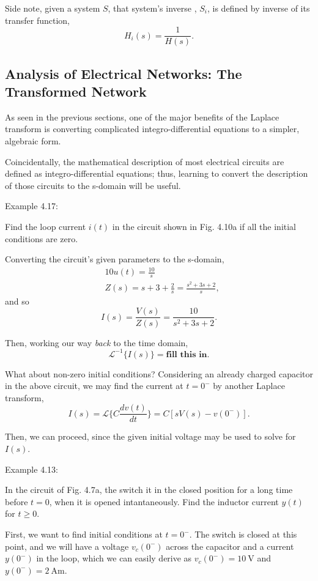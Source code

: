 \documentclass{article}
\begin{document}
Side note, given a system \(S\), that system's inverse , \(S_i\), is defined by inverse of its transfer function, 
\[
  H_i(s) = \frac{1}{H(s)}.
\]

\subsection{Analysis of Electrical Networks: The Transformed Network}

As seen in the previous sections, one of the major benefits of the Laplace transform is converting complicated integro-differential equations to a simpler, algebraic form. 

Coincidentally, the mathematical description of most electrical circuits are defined as integro-differential equations; thus, learning to convert the description of those circuits to the s-domain will be useful.

Example 4.17: 

Find the loop current \(i(t)\) in the circuit shown in Fig. 4.10a if all the initial conditions are zero.

Converting the circuit's given parameters to the s-domain, 
\begin{align*}
	&10u(t) = \frac{10}{s} \\
	&Z(s) = s + 3 + \frac{2}{s} = \frac{s^2 + 3s + 2}{s},
\end{align*}
and so
\[
  I(s) = \frac{V(s)}{Z(s)} = \frac{10}{s^2+3s+2}.
\]

Then, working our way \textit{back} to the time domain, 
\[
	\mathcal{L}^{-1}\{I(s)\} = \mathrm{\textbf{fill this in}}.
\]
  
What about non-zero initial conditions? Considering an already charged capacitor in the above circuit, we may find the current at \(t=0^-\) by another Laplace transform,
\[
	I(s) = \mathcal{L}\{C \frac{dv(t)}{dt}\} = C[sV(s) - v(0^-)].
\]

Then, we can proceed, since the given initial voltage may be used to solve for \(I(s)\).

Example 4.13:

In the circuit of Fig. 4.7a, the switch it in the closed position for a long time before \(t=0\), when it is opened intantaneously. Find the inductor current \(y(t)\) for \(t \geq 0\).

First, we want to find initial conditions at \(t=0^-\). The switch is closed at this point, and we will have a voltage \(v_c(0^-)\) across the capacitor and a current \(y(0^-)\) in the loop, which we can easily derive as \(v_c(0^-) = 10 \ \mathrm{V}\) and \(y(0^-) = 2 \ \mathrm{A}\)m.
\end{document}
